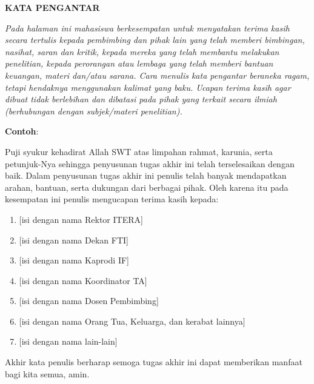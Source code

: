 \clearpage
{}%
\thispagestyle{fancy}

\begin{justifying}
	\large \bfseries \centering \MakeUppercase{Kata Pengantar}
	
	\normalsize \normalfont \justifying
	\textit{Pada halaman ini mahasiswa berkesempatan untuk menyatakan terima kasih secara tertulis kepada pembimbing dan pihak lain yang telah memberi bimbingan, nasihat, saran dan kritik, kepada mereka yang telah membantu melakukan penelitian, kepada perorangan atau lembaga yang telah memberi bantuan keuangan, materi dan/atau sarana. Cara menulis kata pengantar beraneka ragam, tetapi hendaknya menggunakan kalimat yang baku. Ucapan terima kasih agar dibuat tidak berlebihan dan dibatasi pada pihak yang terkait secara ilmiah (berhubungan dengan subjek/materi penelitian). } \par
	
	\textbf{Contoh}:\par
	Puji syukur kehadirat Allah SWT atas limpahan rahmat, karunia, serta petunjuk-Nya sehingga penyusunan tugas akhir ini telah terselesaikan dengan baik. Dalam penyusunan tugas akhir ini penulis telah banyak mendapatkan arahan, bantuan, serta dukungan dari berbagai pihak. Oleh karena itu pada kesempatan ini penulis mengucapan terima kasih kepada: \par
	\begin{enumerate}
		\item {[isi dengan nama Rektor ITERA]}
		\item {[isi dengan nama Dekan FTI]}
		\item {[isi dengan nama Kaprodi IF]}
		\item {[isi dengan nama Koordinator TA]}
		\item {[isi dengan nama Dosen Pembimbing]}
		\item {[isi dengan nama Orang Tua, Keluarga, dan kerabat lainnya]}
		\item {[isi dengan nama lain-lain]}
	\end{enumerate} \par
	Akhir kata penulis berharap semoga tugas akhir ini dapat memberikan manfaat bagi kita semua, amin. 
	\vfill
	
\end{justifying}
\clearpage
